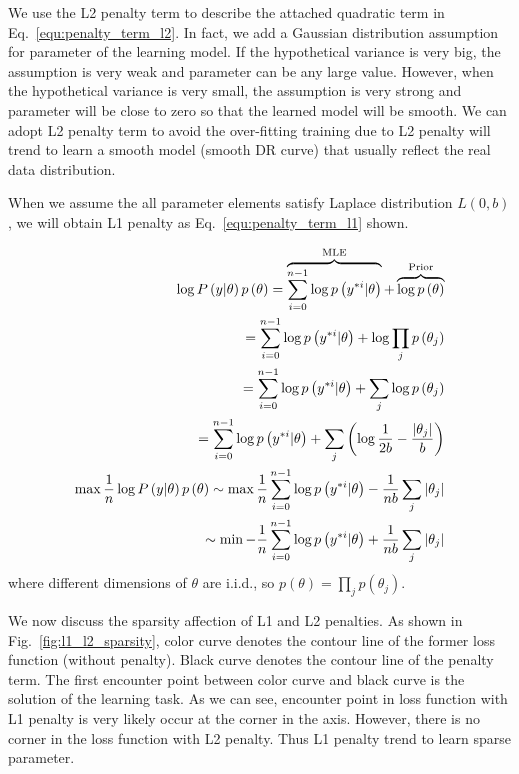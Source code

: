 \documentclass[runningheads,openany]{xhlPaper}
\begin{document}
We use the L2 penalty term to describe the attached quadratic term in Eq.~\ref{equ:penalty_term_l2}.
In fact, we add a Gaussian distribution assumption for parameter of the learning model. If the hypothetical variance is very big, the assumption is very weak and parameter can be any large value. However, when the hypothetical variance is very small, the assumption is very strong and parameter will be close to zero so that the learned model will be smooth.
We can adopt L2 penalty term to avoid the over-fitting training due to L2 penalty will trend to learn a smooth model (smooth DR curve) that usually reflect the real data distribution.

When we assume the all parameter elements satisfy Laplace distribution $L\left(0, b\right)$, we will obtain L1 penalty as Eq.~\ref{equ:penalty_term_l1} shown.

\begin{equation}
\label{equ:penalty_term_l1}
\begin{aligned}
\log P\left( {y|\theta } \right)p\left( \theta  \right) = \overbrace {\sum\limits_{i = 0}^{n - 1} {\log p\left( {{y^{*i}}|\theta } \right)} }^{{\rm{MLE}}} + \overbrace {\log p\left( \theta  \right)}^{{\rm{Prior}}}\\
 = \sum\limits_{i = 0}^{n - 1} {\log p\left( {{y^{*i}}|\theta } \right)}  + \log \prod\limits_j {p\left( {{\theta _j}} \right)} \\
 = \sum\limits_{i = 0}^{n - 1} {\log p\left( {{y^{*i}}|\theta } \right)}  + \sum\limits_j {\log p\left( {{\theta _j}} \right)} \\
 = \sum\limits_{i = 0}^{n - 1} {\log p\left( {{y^{*i}}|\theta } \right)}  + \sum\limits_j {\left( {\log \frac{1}{{2b}} - \frac{{|{\theta _j}|}}{b}} \right)} \\
\max \frac{1}{n}\log P\left( {y|\theta } \right)p\left( \theta  \right) \sim \max \frac{1}{n}\sum\limits_{i = 0}^{n - 1} {\log p\left( {{y^{*i}}|\theta } \right)}  - \frac{1}{{nb}}\sum\limits_j {|{\theta _j}|} \\
 \sim \min  - \frac{1}{n}\sum\limits_{i = 0}^{n - 1} {\log p\left( {{y^{*i}}|\theta } \right)}  + \frac{1}{{nb}}\sum\limits_j {|{\theta _j}|} 
\end{aligned}
\end{equation}
where different dimensions of $\theta$ are i.i.d., so $p\left(\theta\right) = \prod\limits_j {p\left( {{\theta _j}} \right)}$.

We now discuss the sparsity affection of L1 and L2 penalties. As shown in Fig.~\ref{fig:l1_l2_sparsity}, color curve denotes the contour line of the former loss function (without penalty). Black curve denotes the contour line of the penalty term. The first encounter point between color curve and black curve is the solution of the learning task. As we can see, encounter point in loss function with L1 penalty is very likely occur at the corner in the axis. However, there is no corner in the loss function with L2 penalty. Thus L1 penalty trend to learn sparse parameter.
\end{document}
